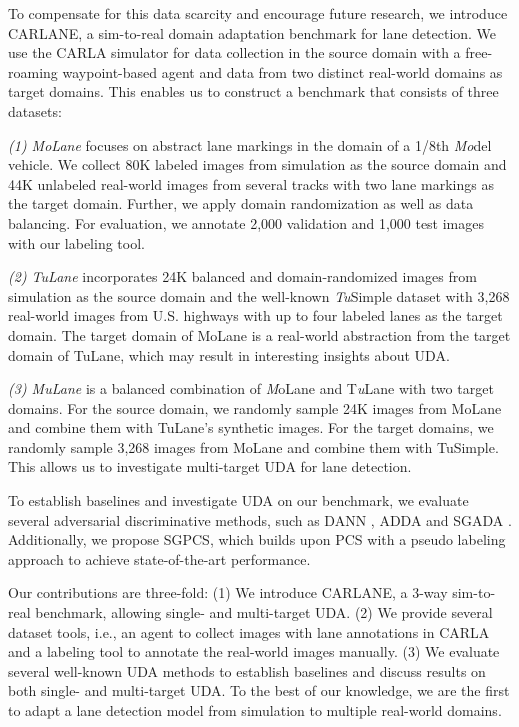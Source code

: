 \documentclass{article}
\begin{document}
	To compensate for this data scarcity and encourage future research, we introduce CARLANE, a sim-to-real domain adaptation benchmark for lane detection. 
	We use the CARLA simulator for data collection in the source domain with a free-roaming waypoint-based agent and data from two distinct real-world domains as target domains. This enables us to construct a benchmark that consists of three datasets:
	\vspace{-2pt}
	
	\textit{(1) MoLane} focuses on abstract lane markings in the domain of a 1/8th \textit{Mo}del vehicle. We collect 80K labeled images from simulation as the source domain and 44K unlabeled real-world images from several tracks with two lane markings as the target domain. Further, we apply domain randomization as well as data balancing. For evaluation, we annotate 2,000 validation and 1,000 test images with our labeling tool.
	
	\vspace{-2pt}
	\textit{(2) TuLane} incorporates 24K balanced and domain-randomized images from simulation as the source domain and the well-known \textit{Tu}Simple \cite{TuSimple2017} dataset with 3,268 real-world images from U.S. highways with up to four labeled lanes as the target domain. The target domain of MoLane is a real-world abstraction from the target domain of TuLane, which may result in interesting insights about UDA.
	
	\vspace{-2pt}
	\textit{(3) MuLane} is a balanced combination of \textit{M}oLane and T\textit{u}Lane with two target domains. For the source domain, we randomly sample 24K images from MoLane and combine them with TuLane's synthetic images. For the target domains, we randomly sample 3,268 images from MoLane and combine them with TuSimple. This allows us to investigate multi-target UDA for lane detection.
	\vspace{-2pt}
	
	To establish baselines and investigate UDA on our benchmark, we evaluate several adversarial discriminative methods, such as DANN \cite{Ganin2016}, ADDA \cite{Tzeng2017ADDA} and SGADA \cite{sgada2021}. Additionally, we propose SGPCS, which builds upon PCS \cite{yue2021prototypical} with a pseudo labeling approach to achieve state-of-the-art performance. 
	
	Our contributions are three-fold: (1) We introduce CARLANE, a 3-way sim-to-real benchmark, allowing single- and multi-target UDA. (2) We provide several dataset tools, i.e., an agent to collect images with lane annotations in CARLA and a labeling tool to annotate the real-world images manually. (3) We evaluate several well-known UDA methods to establish baselines and discuss results on both single- and multi-target UDA. To the best of our knowledge, we are the first to adapt a lane detection model from simulation to multiple real-world domains. 
	
\end{document}
